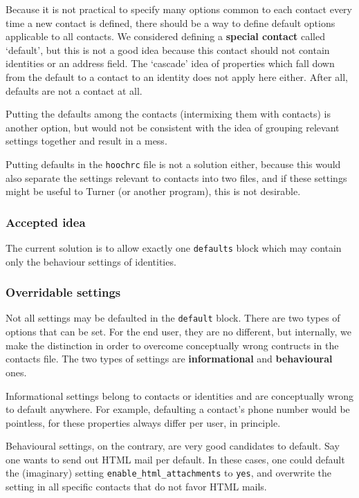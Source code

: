 \documentclass[a4paper]{article}
\begin{document}
Because it is not practical to specify many options common to each
contact every time a new contact is defined, there should be a way to
define default options applicable to all contacts.  We considered
defining a \textbf{special contact} called `default', but this is not a
good idea because this contact should not contain identities or an
address field.  The `cascade' idea of properties which fall down from
the default to a contact to an identity does not apply here either.
After all, defaults are not a contact at all.

Putting the defaults among the contacts (intermixing them with contacts)
is another option, but would not be consistent with the idea of grouping
relevant settings together and result in a mess.

Putting defaults in the \texttt{hoochrc} file is not a solution either,
because this would also separate the settings relevant to contacts into
two files, and if these settings might be useful to Turner (or another
program), this is not desirable.

\subsubsection{Accepted idea}

The current solution is to allow exactly one \texttt{defaults} block
which may contain only the behaviour settings of identities.

\subsubsection{Overridable settings}

Not all settings may be defaulted in the \texttt{default} block.  There
are two types of options that can be set.  For the end user, they are no
different, but internally, we make the distinction in order to overcome
conceptually wrong contructs in the contacts file.  The two types of
settings are \textbf{informational} and \textbf{behavioural} ones.

Informational settings belong to contacts or identities and are
conceptually wrong to default anywhere.  For example, defaulting a
contact's phone number would be pointless, for these properties always
differ per user, in principle.

Behavioural settings, on the contrary, are very good candidates to
default.  Say one wants to send out HTML mail per default.  In these
cases, one could default the (imaginary) setting
\texttt{enable\_html\_attachments} to \texttt{yes}, and overwrite the
setting in all specific contacts that do not favor HTML mails.
\end{document}
